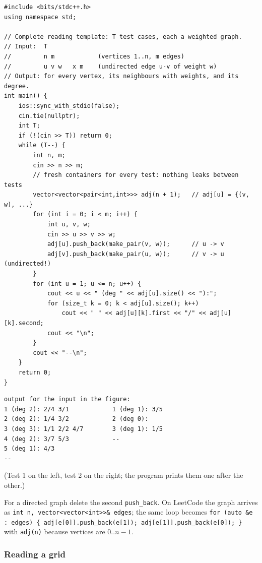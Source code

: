 \begin{lstlisting}[style=cpp]
#include <bits/stdc++.h>
using namespace std;

// Complete reading template: T test cases, each a weighted graph.
// Input:  T
//         n m            (vertices 1..n, m edges)
//         u v w   x m    (undirected edge u-v of weight w)
// Output: for every vertex, its neighbours with weights, and its degree.
int main() {
    ios::sync_with_stdio(false);
    cin.tie(nullptr);
    int T;
    if (!(cin >> T)) return 0;
    while (T--) {
        int n, m;
        cin >> n >> m;
        // fresh containers for every test: nothing leaks between tests
        vector<vector<pair<int,int>>> adj(n + 1);   // adj[u] = {(v, w), ...}
        for (int i = 0; i < m; i++) {
            int u, v, w;
            cin >> u >> v >> w;
            adj[u].push_back(make_pair(v, w));      // u -> v
            adj[v].push_back(make_pair(u, w));      // v -> u (undirected!)
        }
        for (int u = 1; u <= n; u++) {
            cout << u << " (deg " << adj[u].size() << "):";
            for (size_t k = 0; k < adj[u].size(); k++)
                cout << " " << adj[u][k].first << "/" << adj[u][k].second;
            cout << "\n";
        }
        cout << "--\n";
    }
    return 0;
}
\end{lstlisting}

\begin{lstlisting}[style=trace]
output for the input in the figure:
1 (deg 2): 2/4 3/1            1 (deg 1): 3/5
2 (deg 2): 1/4 3/2            2 (deg 0):
3 (deg 3): 1/1 2/2 4/7        3 (deg 1): 1/5
4 (deg 2): 3/7 5/3            --
5 (deg 1): 4/3
--
\end{lstlisting}
(Test 1 on the left, test 2 on the right; the program prints them one after the other.)

\begin{tricksbox}
For a directed graph delete the second \texttt{push\_back}. On LeetCode the graph arrives as \texttt{int n, vector<vector<int>>\& edges}; the same loop becomes \texttt{for (auto \&e : edges) \{ adj[e[0]].push\_back(e[1]); adj[e[1]].push\_back(e[0]); \}} with \texttt{adj(n)} because vertices are $0..n-1$.
\end{tricksbox}

\subsubsection*{Reading a grid}

